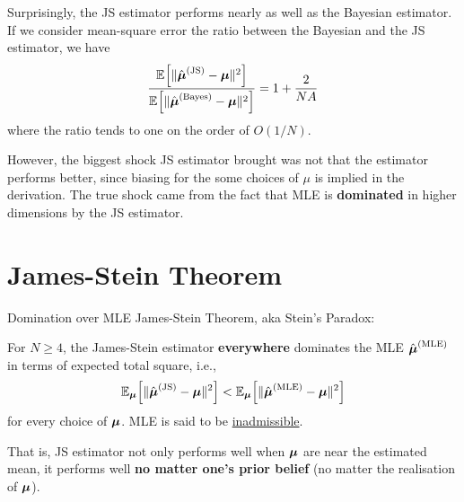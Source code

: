 \documentclass{beamer}
\begin{document}
\begin{frame}{}
	Surprisingly, the JS estimator performs nearly as well as the Bayesian
	estimator. If we consider mean-square error the ratio between the Bayesian
	and the JS estimator, we have
	\begin{align*}
		\frac
			{\E{\|\hat{\bfmu}^{\text{(JS)}}-\bfmu\|^2}}
			{\E{\|\hat{\bfmu}^{\text{(Bayes)}}-\bfmu\|^2}}
		= 1 + \frac{2}{NA}
	\end{align*}
	where the ratio tends to one on the order of $O(1/N)$.
	\begin{block}{}
		However, the biggest shock JS estimator brought was not that the
		estimator performs better, since biasing for the some choices of $\mu$
		is implied in the derivation.  The true shock came from the fact that
		MLE is \textbf{dominated} in higher dimensions by the JS estimator.
	\end{block}
\end{frame}

\section{James-Stein Theorem}

\begin{frame}{Domination over MLE}
	James-Stein Theorem, aka Stein's Paradox:
	\begin{theorem}
		For $N\geq 4$,
		the James-Stein estimator \textbf{everywhere} dominates the MLE
		$\hat{\bfmu}^{\text{(MLE)}}$ in terms of expected total square, i.e.,
		\begin{align*}
			\E[\bfmu]{ \|\hat{\bfmu}^{\text{(JS)}}-\bfmu\|^{2} }
			<
			\E[\bfmu]{ \|\hat{\bfmu}^{\text{(MLE)}}-\bfmu\|^{2} }
		\end{align*}
		for every choice of $\bfmu$.
		MLE is said to be \underline{inadmissible}.
	\end{theorem}
	That is, JS estimator not only performs well when $\bfmu$ are near the
	estimated mean, it performs well \textbf{no matter one's prior belief}
	(no matter the realisation of $\bfmu$).
\end{frame}
\end{document}
